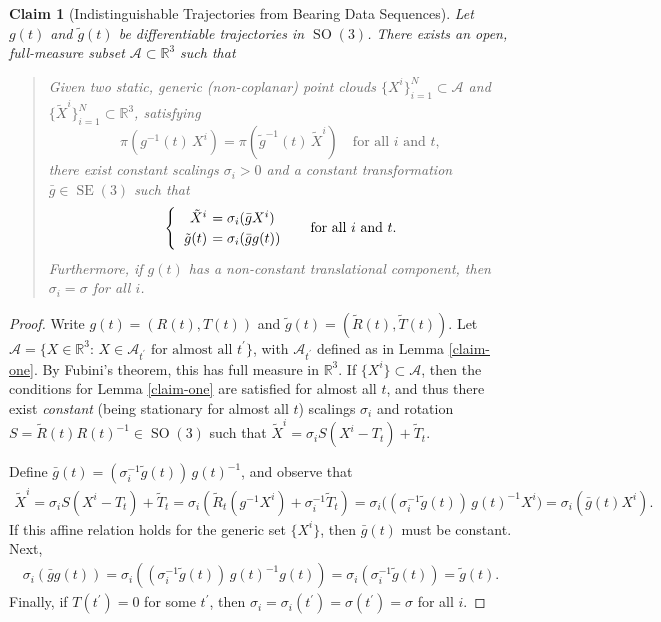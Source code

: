 \documentclass[]{article}
\def\real{\mathbb{R}}
\newtheorem{claim}{Claim}
\def\gw{\tilde{g}}
\def\Xw{\tilde{X}}
\def\Rw{\tilde{R}}
\def\Tw{\tilde{T}}
\def\1{^{\prime}}
\def\inv{^{-1}}
\def\RR{\mathbb{R}}
\def\s{\sigma}
\def\sit{\s_{i}}
\def\subs{\subset}
\def\SO{\operatorname{SO}}
\def\SE{\operatorname{SE}}
\def\Aa{\mathcal{A}}
\begin{document}
\iffalse
\begin{claim}\label{claim-one}
Let $X^i(t) \in \real^3, i = 1, \dots, N(t); t\in {\mathbb Z}$ and $\Xw^i(t) \neq X^i(t)$. Then $\pi(X^i(t)) = \pi(\Xw^i(t))$ if and only if $\Xw^i(t) = \sigma(t) X^i(t) \ \forall \ i, t$, where $\sigma(t) > 0$ is an arbitrary positive scalar-valued function of $t$ (and $i$).
\end{claim}
This follows directly from the definition of the projection map $\pi$.
\fi

\begin{claim}[Indistinguishable Trajectories from Bearing Data Sequences]\label{claim-two}
Let $g(t)$ and $\gw(t)$ be differentiable trajectories in $\SO(3)$.
There exists an open, full-measure subset $\Aa\subs\RR^3$ such that
\begin{quote}
Given two static, generic (non-coplanar) point clouds $\{X^i\}_{i=1}^N\subs\Aa$ 
and $\{\Xw^i\}_{i=1}^N\subs\RR^3$, satisfying
$$\pi(g^{-1}(t)\, X^i) = \pi(\gw^{-1}(t)\, \Xw^i) \quad \text{for all $i$ and $t$},$$
there exist constant scalings $\sigma_i>0$ and a constant transformation $\bar g\in \SE(3)$ such that
\begin{equation}
\begin{cases}
\begin{tabular}{>{$}r<{$} >{$\!\!\!\!\!}l<{$}}
\Xw^i &= \sit (\bar g X^i) \\
\gw(t) &= \sit (\bar g g(t))
\end{tabular}
\end{cases}
\;\text{for all $i$ and $t$.}
\label{eq-gauge}
\end{equation} 
Furthermore, if $g(t)$ has a non-constant translational component, then $\sigma_i=\sigma$ for all $i$.
\end{quote}
\end{claim}
\begin{proof}
Write $g(t) = (R(t), T(t))$ and $\gw(t) = (\Rw(t), \Tw(t))$.
Let $\Aa = \{X\in\RR^3:\, X\in\Aa_{t\1}\text{ for almost all } t\1\}$, with $\Aa_{t\1}$ defined as in Lemma \ref{claim-one}.  
By Fubini's theorem, this has full measure in $\RR^3$.
If $\{X^i\}\subs\Aa$, then the conditions for
Lemma \ref{claim-one} are satisfied for almost all $t$, and thus
there exist \emph{constant} (being stationary for almost all $t$) scalings $\sit$ and rotation 
$S=\Rw(t)R(t)\inv\in \SO(3)$ such that
$\Xw^i = \sit S(X^i - T_t) + \Tw_t$.

Define $\bar g(t) = (\sit\inv \gw(t))\, g(t)\inv$, and observe that
\begin{align*}
\Xw^i = \sit S(X^i - T_t) + \Tw_t
= \sit(\Rw_t(g\inv X^i) + \sit \inv \Tw_t)
=\sit \bigl((\sit \inv \gw(t))\, g(t)\inv X^i\bigr)
=\sit (\bar g(t) X^i).
\end{align*}
If this affine relation holds for the generic set $\{X^i\}$, then $\bar g(t)$ must be constant.  Next,
\begin{align*}
\sit (\bar g g(t)) = \sit((\sit \inv\gw(t))\, g(t)\inv g(t)) = \sit(\sit \inv\gw(t)) = \gw(t).
\end{align*}
Finally, if $T(t\1)=0$ for some $t\1$, then $\sit = \sit(t\1)=\sigma(t\1)=\sigma$
for all $i$.
\end{proof}
\end{document}
